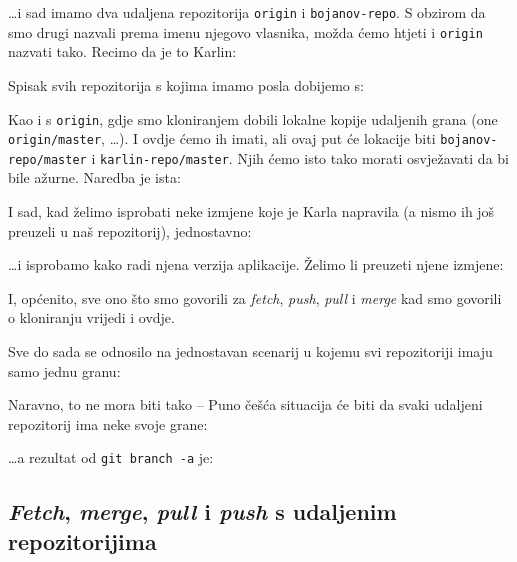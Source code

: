
\dots{}i sad imamo dva udaljena repozitorija \verb+origin+ i \verb+bojanov-repo+.
S obzirom da smo drugi nazvali prema imenu njegovo vlasnika, možda ćemo htjeti i \verb+origin+ nazvati tako.
Recimo da je to Karlin:


Spisak svih repozitorija s kojima imamo posla dobijemo s:



Kao i s \verb+origin+, gdje smo kloniranjem dobili lokalne kopije udaljenih grana (one \verb+origin/master+, \dots). 
I ovdje ćemo ih imati, ali ovaj put će lokacije biti \verb+bojanov-repo/master+ i \verb+karlin-repo/master+.
Njih ćemo isto tako morati osvježavati da bi bile ažurne.
Naredba je ista:


I sad, kad želimo isprobati neke izmjene koje je Karla napravila (a nismo ih još preuzeli u naš repozitorij), jednostavno:


\dots{}i isprobamo kako radi njena verzija aplikacije. Želimo li preuzeti njene izmjene:


I, općenito, sve ono što smo govorili za \emph{fetch}, \emph{push}, \emph{pull} i \emph{merge} kad smo govorili o kloniranju vrijedi i ovdje.

Sve do sada se odnosilo na jednostavan scenarij u kojemu svi repozitoriji imaju samo jednu granu:



Naravno, to ne mora biti tako -- Puno češća situacija će biti da svaki udaljeni repozitorij ima neke svoje grane:



\dots{}a rezultat od \verb+git branch -a+ je:



\subsection*{\emph{Fetch}, \emph{merge}, \emph{pull} i \emph{push} s udaljenim repozitorijima}

